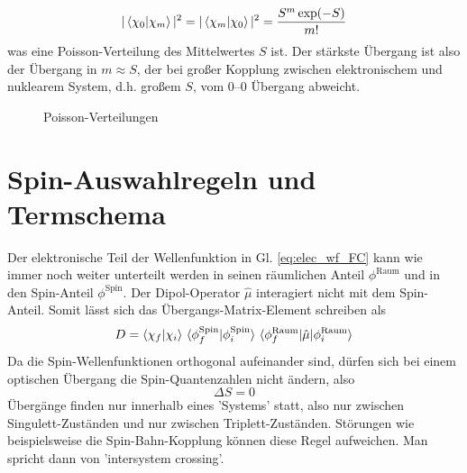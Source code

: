 \begin{equation}
 | \braket{ \chi_0 | \chi_m } | ^2  =  | \braket{ \chi_m | \chi_0 } | ^2 = \frac{S^m \exp(-S)}{m!}
\end{equation}
was eine Poisson-Verteilung des Mittelwertes $S$ ist.  Der stärkste Übergang ist also der Übergang in $m \approx S$, der bei großer Kopplung zwischen elektronischem und nuklearem System, d.h. großem $S$, vom 0--0 Übergang abweicht.

\begin{figure}
  \caption{Poisson-Verteilungen}
\end{figure}


\section{Spin-Auswahlregeln und Termschema}

Der elektronische Teil der Wellenfunktion in Gl. \ref{eq:elec_wf_FC} kann wie immer noch weiter unterteilt werden in seinen räumlichen Anteil $\phi^\text{Raum}$ und in den Spin-Anteil  $\phi^\text{Spin}$. Der Dipol-Operator $\hat{\mu}$ interagiert nicht mit dem Spin-Anteil. Somit lässt sich das Übergangs-Matrix-Element schreiben als
\begin{equation}
 D =   \braket{\chi_f | \chi_i} \,    \braket{\phi^\text{Spin}_f | \phi^\text{Spin}_i}  \,
  \braket{\phi^\text{Raum}_f | \hat{\mu} | \phi^\text{Raum}_i} 
\end{equation}
Da die Spin-Wellenfunktionen orthogonal aufeinander sind, dürfen sich bei einem optischen Übergang die Spin-Quantenzahlen nicht ändern, also
\begin{equation}
 \Delta S = 0
\end{equation}
Übergänge finden nur innerhalb eines 'Systems' statt, also nur zwischen  Singulett-Zuständen und nur zwischen   Triplett-Zuständen.
Störungen wie beispielsweise die Spin-Bahn-Kopplung können diese Regel aufweichen. Man spricht dann von 'intersystem crossing'.

